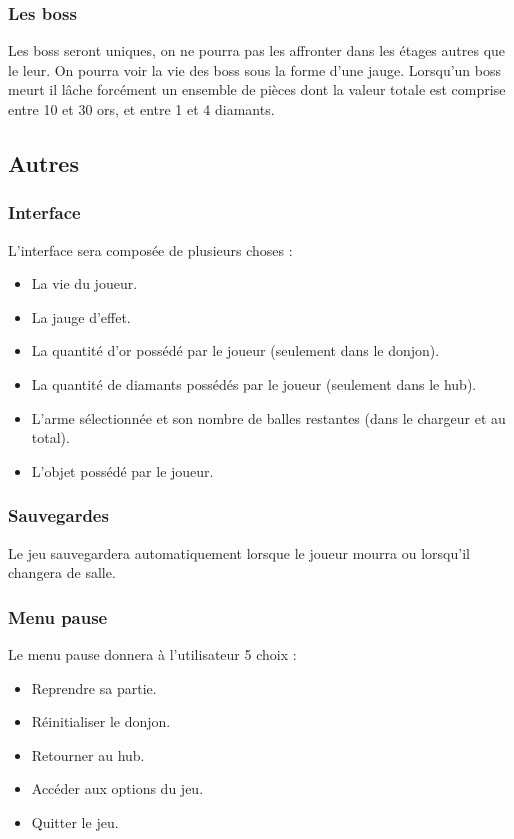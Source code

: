 \documentclass[]{extarticle}
\begin{document}
		\subsubsection{Les boss}
\bigbreak
\bigbreak
Les boss seront uniques, on ne pourra pas les affronter dans les étages autres que le leur.
On pourra voir la vie des boss sous la forme d’une jauge. Lorsqu’un boss meurt il lâche forcément un ensemble de pièces dont la valeur totale est comprise entre 10 et 30 ors, et entre 1 et 4 diamants.
\bigbreak
\newpage
	\subsection{Autres}
		\subsubsection{Interface}
\bigbreak
\bigbreak
L’interface sera composée de plusieurs choses :
\begin{itemize}
\item La vie du joueur.
\item La jauge d’effet.
\item La quantité d’or possédé par le joueur (seulement dans le donjon).
\item La quantité de diamants possédés par le joueur (seulement dans le hub).
\item L’arme sélectionnée et son nombre de balles restantes (dans le chargeur et au total).
\item L’objet possédé par le joueur.
\end{itemize}
\bigbreak

		\subsubsection{Sauvegardes}
\bigbreak
\bigbreak
Le jeu sauvegardera automatiquement lorsque le joueur mourra ou lorsqu’il changera de salle.
\bigbreak

		\subsubsection{Menu pause}
\bigbreak
\bigbreak
Le menu pause donnera à l’utilisateur 5 choix :
\begin{itemize}
\item Reprendre sa partie.
\item Réinitialiser le donjon.
\item Retourner au hub.
\item Accéder aux options du jeu.
\item Quitter le jeu.
\end{itemize}
\end{document}
